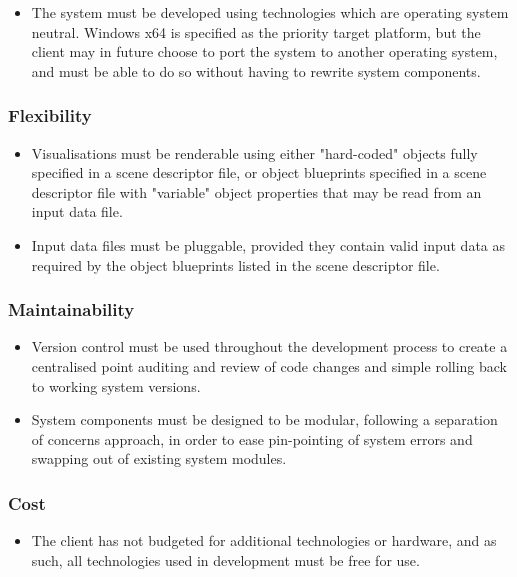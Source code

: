 \documentclass[a4paper,12pt]{article}
\begin{document}
		\begin{itemize}
			\item The system must be developed using technologies which are operating system neutral. Windows x64 is specified as the priority target platform, but the client may in future choose to port the system to another operating system, and must be able to do so without having to rewrite system components.
		\end{itemize}
	
	\subsubsection{Flexibility}
	
		\begin{itemize}
			\item Visualisations must be renderable using either "hard-coded" objects fully specified in a scene descriptor file, or object blueprints specified in a scene descriptor file with "variable" object properties that may be read from an input data file.
			\item Input data files must be pluggable, provided they contain valid input data as required by the object blueprints listed in the scene descriptor file.
		\end{itemize}
		
	\subsubsection{Maintainability}
	
		\begin{itemize}
			\item Version control must be used throughout the development process to create a centralised point auditing and review of code changes and simple rolling back to working system versions.
			\item System components must be designed to be modular, following a separation of concerns approach, in order to ease pin-pointing of system errors and swapping out of existing system modules.
		\end{itemize}
		
	\subsubsection{Cost}
	
		\begin{itemize}
			\item The client has not budgeted for additional technologies or hardware, and as such, all technologies used in development must be free for use.
		\end{itemize}
	
\end{document}
